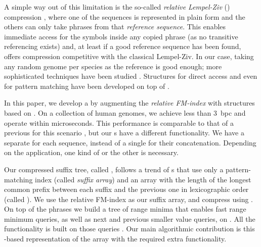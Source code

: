 A simple way out of this limitation is the so-called \emph{relative Lempel-Ziv}
(\RLZ) compression \cite{Kuruppu2010}, where one of the sequences is represented
in plain form and the others can only take phrases from that \emph{reference
sequence}. This enables immediate access for the symbols inside any copied
phrase (as no transitive referencing exists) and, at least if a good reference
sequence has been found, offers compression competitive with the
classical Lempel-Ziv. In our case, taking any random genome per species as the
reference is good enough; more sophisticated techniques have been studied
\cite{KPZ11,KBSCZ12}. Structures for direct access \cite{DG11,Ferrada2014}
and even for pattern matching \cite{DJSS14,Belazzougui2014} have been developed
on top of \RLZ.

In this paper, we develop a \CST{} by augmenting the \emph{relative FM-index}
\cite{Belazzougui2014} with structures based on \RLZ.
On a collection of human genomes, we achieve less than 3~bpc and operate
within microseconds. This performance is comparable to that of a previous \CST{}
for this scenario \cite{Navarro2015}, but our \CST{}s have a different
functionality. We have a separate \CST{} for each sequence, instead of a single
\CST{} for their concatenation. Depending on the application, one kind of \CST{} or
the other is necessary.

Our compressed suffix tree, called \RST, follows a trend of \CST{}s
\cite{Fischer2009a,Ohlebusch2009,Fis10,Ohlebusch2010,Gog2011a,Abeliuk2013} that use only a pattern-matching index
(called \emph{suffix array}) and an array with the length of the longest common prefix
between each suffix and the previous one in lexicographic order (called \LCP).
We use the relative FM-index as our suffix array, and
compress \LCP{} using \RLZ. On top of the \RLZ{} phrases we build a tree
of range minima that enables fast range minimum queries, as well as
next and previous smaller value queries, on \LCP{} \cite{Abeliuk2013}. All the \CST{} functionality
is built on those queries \cite{Fischer2009a}. Our main algorithmic contribution
is this \RLZ\nobreakdash-based representation of the \LCP{} array with the required extra
functionality.

